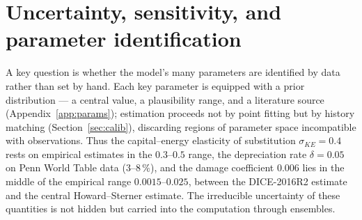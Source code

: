 \documentclass[11pt,a4paper]{article}
\begin{document}
\section{Uncertainty, sensitivity, and parameter identification}
\label{sec:uq}

A key question is whether the model's many parameters are identified by data rather than set by
hand. Each key parameter is equipped with a prior distribution --- a central value, a plausibility
range, and a literature source (Appendix~\ref{app:params}); estimation proceeds not by point fitting
but by history matching (Section~\ref{sec:calib}), discarding regions of parameter space
incompatible with observations. Thus the capital--energy elasticity of substitution
$\sigma_{KE}=0.4$ rests on empirical estimates in the $0.3$--$0.5$ range, the depreciation rate
$\delta=0.05$ on Penn World Table data ($3$--$8\,\%$), and the damage coefficient $0.006$ lies in the
middle of the empirical range $0.0015$--$0.025$, between the DICE-2016R2 estimate and the central
Howard--Sterner estimate. The irreducible uncertainty of these quantities is not hidden but carried
into the computation through ensembles.
\end{document}
